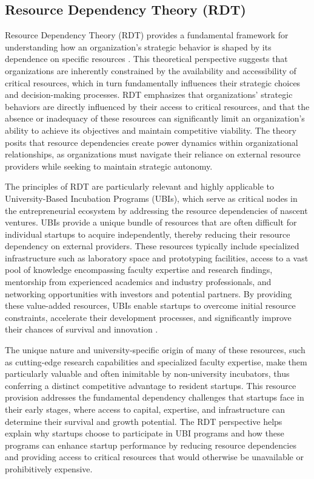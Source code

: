 \documentclass[../Main.tex]{subfiles}
\begin{document}
\subsection{Resource Dependency Theory (RDT)}

Resource Dependency Theory (RDT) provides a fundamental framework for understanding how an organization's strategic behavior is shaped by its dependence on specific resources \autocite{pfeffer1978external}. This theoretical perspective suggests that organizations are inherently constrained by the availability and accessibility of critical resources, which in turn fundamentally influences their strategic choices and decision-making processes. RDT emphasizes that organizations' strategic behaviors are directly influenced by their access to critical resources, and that the absence or inadequacy of these resources can significantly limit an organization's ability to achieve its objectives and maintain competitive viability. The theory posits that resource dependencies create power dynamics within organizational relationships, as organizations must navigate their reliance on external resource providers while seeking to maintain strategic autonomy.

The principles of RDT are particularly relevant and highly applicable to University-Based Incubation Programs (UBIs), which serve as critical nodes in the entrepreneurial ecosystem by addressing the resource dependencies of nascent ventures. UBIs provide a unique bundle of resources that are often difficult for individual startups to acquire independently, thereby reducing their resource dependency on external providers. These resources typically include specialized infrastructure such as laboratory space and prototyping facilities, access to a vast pool of knowledge encompassing faculty expertise and research findings, mentorship from experienced academics and industry professionals, and networking opportunities with investors and potential partners. By providing these value-added resources, UBIs enable startups to overcome initial resource constraints, accelerate their development processes, and significantly improve their chances of survival and innovation \autocite{mian1996assessing}.

The unique nature and university-specific origin of many of these resources, such as cutting-edge research capabilities and specialized faculty expertise, make them particularly valuable and often inimitable by non-university incubators, thus conferring a distinct competitive advantage to resident startups. This resource provision addresses the fundamental dependency challenges that startups face in their early stages, where access to capital, expertise, and infrastructure can determine their survival and growth potential. The RDT perspective helps explain why startups choose to participate in UBI programs and how these programs can enhance startup performance by reducing resource dependencies and providing access to critical resources that would otherwise be unavailable or prohibitively expensive.
\end{document}
